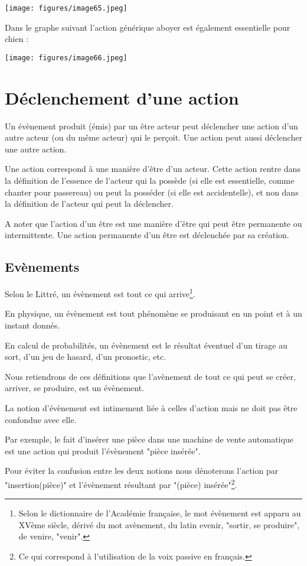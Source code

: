 \documentclass[a4paper, 12pt, openright, french]{book}
\begin{document}
\texttt{[image: figures/image65.jpeg]}

Dans le graphe suivant l'action générique aboyer est
également essentielle pour chien :

\texttt{[image: figures/image66.jpeg]}


\section{Déclenchement d'une action}

Un évènement produit (émis) par un être acteur peut déclencher une
action d'un autre acteur (ou du même acteur) qui le
perçoit. Une action peut aussi déclencher une autre action.

Une action correspond à une manière d'être
d'un acteur. Cette action rentre dans la définition de
l'essence de l'acteur qui la possède (si
elle est essentielle, comme chanter pour passereau) ou peut la posséder
(si elle est accidentelle), et non dans la définition de
l'acteur qui peut la déclencher.

A noter que l'action d'un être est une
manière d'être qui peut être permanente ou
intermittente. Une action permanente d'un être est
déclenchée par sa création.

\subsection{Evènements}

Selon le Littré, un évènement est tout ce qui arrive\footnote{Selon le dictionnaire de l'Académie
	française, le mot évènement est apparu au XVème siècle, dérivé du mot
	avènement, du latin evenir, "sortir, se produire", de venire, "venir".}.

En physique, un évènement est tout phénomène se produisant en un point
et à un instant donnés.

En calcul de probabilités, un évènement est le résultat éventuel d'un
tirage au sort, d'un jeu de hasard, d'un pronostic, etc.~

Nous retiendrons de ces définitions que l'avènement de
tout ce qui peut se créer, arriver, se produire, est un évènement.

La notion d'évènement est intimement liée à celles
d'action mais ne doit pas être confondue avec elle.

Par exemple, le fait d'insérer une pièce dans une
machine de vente automatique est une action qui produit
l'évènement "pièce insérée".

Pour éviter la confusion entre les deux notions nous dénoterons
l'action par "insertion(pièce)" et
l'évènement résultant par "(pièce)
insérée"\footnote{Ce qui correspond à l'utilisation de
	la voix passive en français.}.
\end{document}
